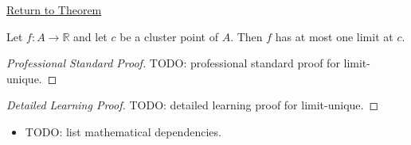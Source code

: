 \newpage
{}
\label{prf:limit-unique}

\begin{remark*}[Return]
\hyperref[thm:limit-unique]{Return to Theorem}
\end{remark*}

\begin{theorem*}
Let $f : A \to \mathbb{R}$ and let $c$ be a cluster point of $A$.
Then $f$ has at most one limit at $c$.

\smallskip\noindent
\end{theorem*}

\begin{proof}[Professional Standard Proof]
\LRAProofBodyStart
TODO: professional standard proof for limit-unique.
\end{proof}

\begin{proof}[Detailed Learning Proof]
\LRAProofBodyStart
TODO: detailed learning proof for limit-unique.
\end{proof}

\begin{remark*}
\end{remark*}

\begin{dependencies}
\begin{itemize}
  \item TODO: list mathematical dependencies.
\end{itemize}
\end{dependencies}

\clearpage
